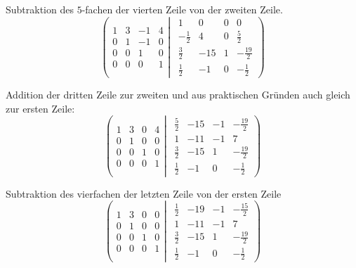 \documentclass[a4paper,german,12pt,smallheadings]{scrartcl}
\begin{document}
Subtraktion des $5$-fachen der vierten Zeile von der zweiten Zeile.
\begin{equation*}
\left(
 \begin{matrix}
 1 & 3 & -1 & 4 \\
 0 & 1 & -1 & 0 \\
 0 & 0 & 1 & 0 \\
 0 & 0 & 0 & 1
 \end{matrix}
 \left|
  \hspace{5pt}
  \begin{matrix}
  1 & 0 & 0 & 0 \\
  -\frac{1}{2} & 4 & 0 & \frac{5}{2} \\
  \frac{3}{2} & -15 & 1 & -\frac{19}{2} \\
  \frac{1}{2} & -1 & 0 & -\frac{1}{2}
  \end{matrix}
 \right)
\right.
\end{equation*}

Addition der dritten Zeile zur zweiten und aus praktischen Gründen auch gleich zur ersten Zeile:
\begin{equation*}
\left(
 \begin{matrix}
 1 & 3 & 0 & 4 \\
 0 & 1 & 0 & 0 \\
 0 & 0 & 1 & 0 \\
 0 & 0 & 0 & 1
 \end{matrix}
 \left|
  \hspace{5pt}
  \begin{matrix}
  \frac{5}{2} & -15 & -1 & -\frac{19}{2} \\
  1 & -11 & -1 & 7 \\
  \frac{3}{2} & -15 & 1 & -\frac{19}{2} \\
  \frac{1}{2} & -1 & 0 & -\frac{1}{2}
  \end{matrix}
 \right)
\right.
\end{equation*}

Subtraktion des vierfachen der letzten Zeile von der ersten Zeile
\begin{equation*}
\left(
 \begin{matrix}
 1 & 3 & 0 & 0 \\
 0 & 1 & 0 & 0 \\
 0 & 0 & 1 & 0 \\
 0 & 0 & 0 & 1
 \end{matrix}
 \left|
  \hspace{5pt}
  \begin{matrix}
  \frac{1}{2} & -19 & -1 & -\frac{15}{2} \\
  1 & -11 & -1 & 7 \\
  \frac{3}{2} & -15 & 1 & -\frac{19}{2} \\
  \frac{1}{2} & -1 & 0 & -\frac{1}{2}
  \end{matrix}
 \right)
\right.
\end{equation*}
\end{document}
